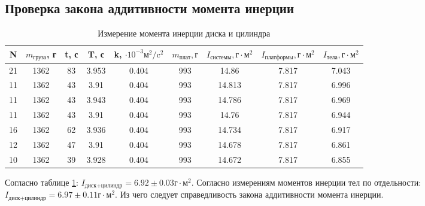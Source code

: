 \documentclass[a4, 12pt]{article}
\begin{document}
\subsection{Проверка закона аддитивности момента инерции}
\begin{table} \label{Диск+цилиндр} \caption{Измерение момента инерции диска и цилиндра} \begin{tabular}{|c|c|c|c|c|c|c|c|c|} \hline N & $m_\text{груза}$, г & t, с & T, с & k, $\cdot 10^{-3}\text{м}^2/\text{c}^2$ & $m_\text{плат}, г$ & $I_\text{системы}, \text{г}\cdot \text{м}^2$ &$I_\text{платформы}, \text{г}\cdot \text{м}^2$ & $I_\text{тела}, \text{г}\cdot \text{м}^2$ \\  \hline 21 & 1362 & 83 & 3.953 & 0.404 & 993 & 14.86 & 7.817 & 7.043 \\ \hline 11 & 1362 & 43 & 3.91 & 0.404 & 993 & 14.813 & 7.817 & 6.996 \\ \hline 11 & 1362 & 43 & 3.943 & 0.404 & 993 & 14.786 & 7.817 & 6.969 \\ \hline 11 & 1362 & 43 & 3.91 & 0.404 & 993 & 14.76 & 7.817 & 6.944 \\ \hline 16 & 1362 & 62 & 3.936 & 0.404 & 993 & 14.734 & 7.817 & 6.917 \\ \hline 12 & 1362 & 47 & 3.91 & 0.404 & 993 & 14.678 & 7.817 & 6.861 \\ \hline 10 & 1362 & 39 & 3.928 & 0.404 & 993 & 14.672 & 7.817 & 6.855 \\ \hline \end{tabular} \end{table}

Согласно таблице \ref{Диск+цилиндр}: $I_\text{диск+цилиндр}=6.92 \pm 0.03 \text{г}\cdot \text{м}^2$. Согласно измерениям моментов инерции тел по отдельности:
$I_\text{диск+цилиндр}=6.97 \pm 0.11 \text{г}\cdot \text{м}^2$.
Из чего следует справедливость закона аддитивности момента инерции.
\end{document}
